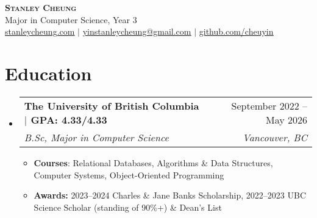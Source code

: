 \documentclass[letterpaper]{article}
\makeatletter
\newcommand{\resumeItem}[1]{
  \item\small{
    {#1 \vspace{-2pt}}
  }
}
\newcommand{\resumeSubheading}[4]{
  \vspace{-2pt}\item
    \begin{tabular*}{0.97\textwidth}[t]{l@{\extracolsep{\fill}}r}
      \textbf{#1} & #2 \\
      \textit{\small#3} & \textit{\small #4} \\
    \end{tabular*}\vspace{-7pt}
}
\newcommand{\resumeSubHeadingListStart}{\begin{itemize}[leftmargin=0.15in, label={}]}
\newcommand{\resumeSubHeadingListEnd}{\end{itemize}}
\newcommand{\resumeItemListStart}{\begin{itemize}}
\newcommand{\resumeItemListEnd}{\end{itemize}\vspace{-5pt}}
\makeatother
\begin{document}

\begin{center}
    \color{NavyBlue}
    \textbf{\huge \scshape Stanley Cheung} \\ 
    \vspace{5pt}
    \color{black}
    {\large Major in Computer Science, Year 3} \\
    \vspace{5pt}    
		\href{https://stanleycheung.com}{\underline{stanleycheung.com}} $|$
    \href{mailto:yinstanleycheung@gmail.com}{\underline{yinstanleycheung@gmail.com}} $|$ 
    \href{https://github.com/cheuyin}{\underline{github.com/cheuyin}}
\end{center}

\color{NavyBlue}
\section{Education}
\color{black}
  \resumeSubHeadingListStart
    \resumeSubheading
      {The University of British Columbia $|$ GPA: 4.33/4.33}{September 2022 -- May 2026}
      {B.Sc, Major in Computer Science}{Vancouver, BC}
      \resumeItemListStart 
        \resumeItem{\textbf{Courses}: Relational Databases, Algorithms \& Data Structures, Computer Systems, Object-Oriented Programming}
        \resumeItem{\textbf{Awards:} 2023--2024 Charles \& Jane Banks Scholarship, 2022--2023 UBC Science Scholar (standing of 90\%+) \& Dean's List}
      \resumeItemListEnd 
  \resumeSubHeadingListEnd

\color{NavyBlue}
\end{document}
